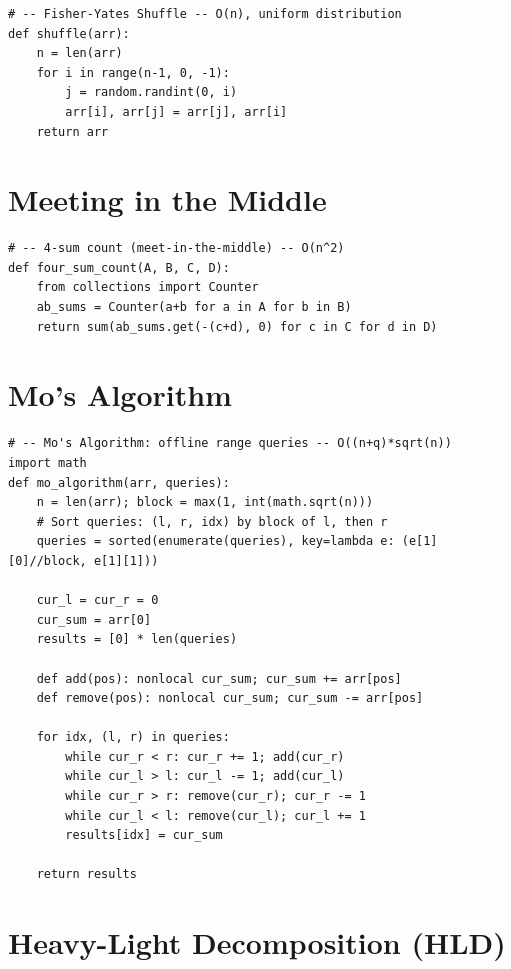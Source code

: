 \documentclass[11pt,a4paper]{report}
\begin{document}
\begin{lstlisting}
# -- Fisher-Yates Shuffle -- O(n), uniform distribution
def shuffle(arr):
    n = len(arr)
    for i in range(n-1, 0, -1):
        j = random.randint(0, i)
        arr[i], arr[j] = arr[j], arr[i]
    return arr
\end{lstlisting}

\section{Meeting in the Middle}

\begin{lstlisting}
# -- 4-sum count (meet-in-the-middle) -- O(n^2)
def four_sum_count(A, B, C, D):
    from collections import Counter
    ab_sums = Counter(a+b for a in A for b in B)
    return sum(ab_sums.get(-(c+d), 0) for c in C for d in D)
\end{lstlisting}

\section{Mo's Algorithm}

\begin{lstlisting}
# -- Mo's Algorithm: offline range queries -- O((n+q)*sqrt(n))
import math
def mo_algorithm(arr, queries):
    n = len(arr); block = max(1, int(math.sqrt(n)))
    # Sort queries: (l, r, idx) by block of l, then r
    queries = sorted(enumerate(queries), key=lambda e: (e[1][0]//block, e[1][1]))

    cur_l = cur_r = 0
    cur_sum = arr[0]
    results = [0] * len(queries)

    def add(pos): nonlocal cur_sum; cur_sum += arr[pos]
    def remove(pos): nonlocal cur_sum; cur_sum -= arr[pos]

    for idx, (l, r) in queries:
        while cur_r < r: cur_r += 1; add(cur_r)
        while cur_l > l: cur_l -= 1; add(cur_l)
        while cur_r > r: remove(cur_r); cur_r -= 1
        while cur_l < l: remove(cur_l); cur_l += 1
        results[idx] = cur_sum

    return results
\end{lstlisting}

\section{Heavy-Light Decomposition (HLD)}
\end{document}
